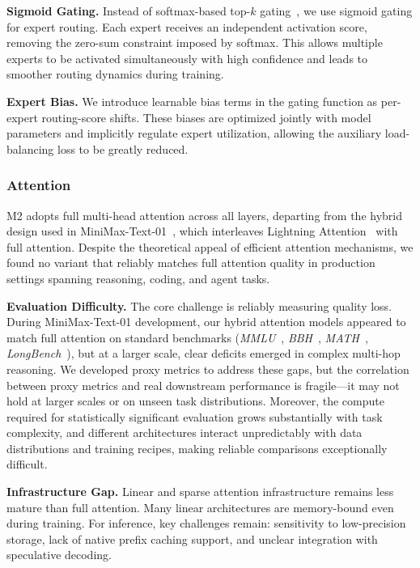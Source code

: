 \noindent \textbf{Sigmoid Gating.} Instead of softmax-based top-$k$ gating~\citep{shazeer2017moe}, we use sigmoid gating for expert routing. Each expert receives an independent activation score, removing the zero-sum constraint imposed by softmax. This allows multiple experts to be activated simultaneously with high confidence and leads to smoother routing dynamics during training.

\noindent \textbf{Expert Bias.} We introduce learnable bias terms in the gating function as per-expert routing-score shifts. These biases are optimized jointly with model parameters and implicitly regulate expert utilization, allowing the auxiliary load-balancing loss to be greatly reduced.

\subsubsection{Attention}
\label{sec:attention-design}

M2 adopts full multi-head attention across all layers, departing from the hybrid design used in MiniMax-Text-01~\citep{minimax2025minimax01}, which interleaves Lightning Attention~\citep{qin2024lightning} with full attention. Despite the theoretical appeal of efficient attention mechanisms, we found no variant that reliably matches full attention quality in production settings spanning reasoning, coding, and agent tasks.

\noindent \textbf{Evaluation Difficulty.} The core challenge is reliably measuring quality loss. During MiniMax-Text-01 development, our hybrid attention models appeared to match full attention on standard benchmarks (\emph{MMLU}~\citep{hendrycks2021mmlu}, \emph{BBH}~\citep{suzgun2023challenging}, \emph{MATH}~\citep{hendrycks2021math}, \emph{LongBench}~\citep{bai2024longbench}), but at a larger scale, clear deficits emerged in complex multi-hop reasoning. We developed proxy metrics to address these gaps, but the correlation between proxy metrics and real downstream performance is fragile---it may not hold at larger scales or on unseen task distributions. Moreover, the compute required for statistically significant evaluation grows substantially with task complexity, and different architectures interact unpredictably with data distributions and training recipes, making reliable comparisons exceptionally difficult.

\noindent \textbf{Infrastructure Gap.} Linear and sparse attention infrastructure remains less mature than full attention. Many linear architectures are memory-bound even during training. For inference, key challenges remain: sensitivity to low-precision storage, lack of native prefix caching support, and unclear integration with speculative decoding.

